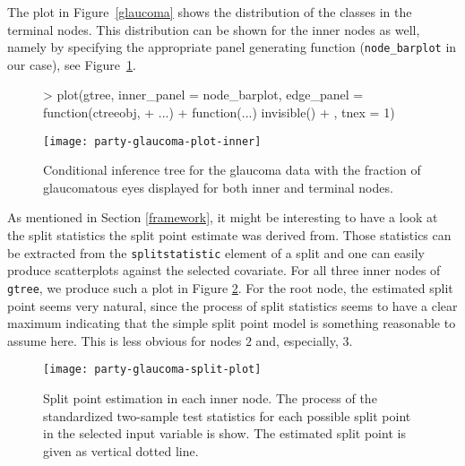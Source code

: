 \documentclass[letter]{article}
\begin{document}
The plot in Figure~\ref{glaucoma} shows the distribution of the classes in 
the terminal nodes. This distribution can be shown for the inner nodes as
well, namely by specifying the appropriate panel generating function
(\texttt{node\_barplot} in our case), see Figure~\ref{glaucoma-inner}.

\begin{figure}[ht!]
\begin{center}
\begin{Schunk}
\begin{Sinput}
> plot(gtree, inner_panel = node_barplot, edge_panel = function(ctreeobj, 
+     ...) {
+     function(...) invisible()
+ }, tnex = 1)
\end{Sinput}
\end{Schunk}
\texttt{[image: party-glaucoma-plot-inner]}
\caption{Conditional inference tree for the glaucoma data with the 
         fraction of glaucomatous eyes displayed for both inner and terminal
         nodes. \label{glaucoma-inner}}
\end{center}
\end{figure}


As mentioned in Section \ref{framework}, it might be interesting to have a
look at the split statistics the split point estimate was derived from.
Those statistics can be extracted from the \texttt{splitstatistic} element
of a split and one can easily produce scatterplots against the selected
covariate. For all three inner nodes of \texttt{gtree}, we produce such a
plot in Figure \ref{glaucoma-split}. For the root node, the estimated split point
seems very natural, since the process of split statistics seems to have a
clear maximum indicating that the simple split point model is something
reasonable to assume here. This is less obvious for nodes $2$ and,
especially, $3$.

\begin{figure}[t]
\begin{center}
\begin{Schunk}
\end{Schunk}
\texttt{[image: party-glaucoma-split-plot]}
\caption{Split point estimation in each inner node. The process of 
         the standardized two-sample test statistics for each possible 
         split point in the selected input variable is show.
         The estimated split point is given as vertical dotted line.
         \label{glaucoma-split}}
\end{center}
\end{figure}
\end{document}
